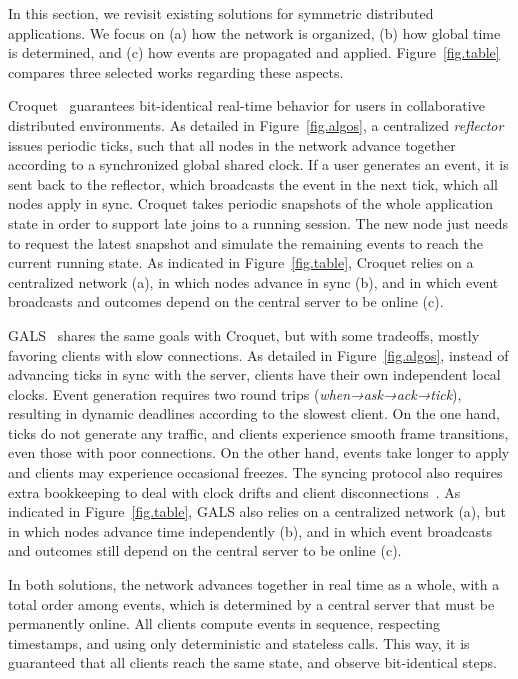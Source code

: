 \documentclass[sn-mathphys,iicol]{sn-jnl}%
\begin{document}
In this section, we revisit existing solutions for symmetric distributed
applications.
We focus on
    (a) how the network is organized,
    (b) how global time is determined, and
    (c) how events are propagated and applied.
Figure~\ref{fig.table} compares three selected works regarding these aspects.

Croquet~\cite{croquet,croquet.site} guarantees bit-identical real-time behavior
for users in collaborative distributed environments.
%
As detailed in Figure~\ref{fig.algos}, a centralized \emph{reflector} issues
periodic ticks, such that all nodes in the network advance together according
to a synchronized global shared clock.
If a user generates an event, it is sent back to the reflector, which
broadcasts the event in the next tick, which all nodes apply in sync.
%
Croquet takes periodic snapshots of the whole application state in order to
support late joins to a running session.
The new node just needs to request the latest snapshot and simulate the
remaining events to reach the current running state.
%
As indicated in Figure~\ref{fig.table}, Croquet relies on a centralized
network (a), in which nodes advance in sync (b), and in which event broadcasts
and outcomes depend on the central server to be online (c).

GALS~\cite{gals} shares the same goals with Croquet, but with some tradeoffs,
mostly favoring clients with slow connections.
As detailed in Figure~\ref{fig.algos}, instead of advancing ticks in sync with
the server, clients have their own independent local clocks.
Event generation requires two round trips (\emph{when→ask→ack→tick}), resulting
in dynamic deadlines according to the slowest client.
%
On the one hand, ticks do not generate any traffic, and clients experience
smooth frame transitions, even those with poor connections.
On the other hand, events take longer to apply and clients may experience
occasional freezes.
The syncing protocol also requires extra bookkeeping to deal with clock drifts
and client disconnections~\cite{gals}.
%
As indicated in Figure~\ref{fig.table}, GALS also relies on a centralized
network (a), but in which nodes advance time independently (b), and in which
event broadcasts and outcomes still depend on the central server to be online
(c).

In both solutions, the network advances together in real time as a whole, with
a total order among events, which is determined by a central server that must
be permanently online.
All clients compute events in sequence, respecting timestamps, and using only
deterministic and stateless calls.
This way, it is guaranteed that all clients reach the same state, and
observe bit-identical steps.
\end{document}
